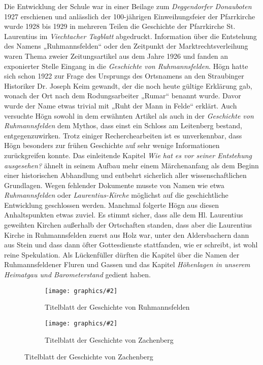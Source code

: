 \documentclass{book}
\newcommand{\img}[2][width=\linewidth]{\noindent\texttt{[image: graphics/\#2]}}
\begin{document}
Die Entwicklung der Schule war in einer Beilage zum \textit{Deggendorfer
Donauboten} 1927 erschienen und anlässlich der 100-jährigen
Einweihungsfeier der Pfarrkirche wurde 1928 bis 1929 in mehreren Teilen
die Geschichte der Pfarrkirche St. Laurentius im \textit{Viechtacher
Tagblatt} abgedruckt. Information über die Entstehung des Namens
„Ruhmannsfelden“ oder den Zeitpunkt der Marktrechtsverleihung waren
Thema zweier Zeitungsartikel aus dem Jahre 1926 und fanden an
exponierter Stelle Eingang in die \textit{Geschichte von
Ruhmannsfelden}. Högn hatte sich schon 1922 zur Frage des Ursprungs des
Ortsnamens an den Straubinger Historiker Dr. Joseph Keim gewandt, der
die noch heute gültige Erklärung gab, wonach der Ort nach dem
Rodungsarbeiter „Rumar“ benannt wurde. Davor wurde der Name etwas
trivial mit „Ruht der Mann in Felde“ erklärt. Auch versuchte Högn
sowohl in dem erwähnten Artikel als auch in der \textit{Geschichte von
Ruhmannsfelden} dem Mythos, dass einst ein Schloss am Leitenberg
bestand, entgegenzuwirken. Trotz einiger Recherchearbeiten ist es
unverkennbar, dass Högn besonders zur frühen Geschichte auf sehr
wenige Informationen zurückgreifen konnte. Das einleitende Kapitel
\textit{Wie hat es vor seiner Entstehung ausgesehen?} ähnelt in seinem
Aufbau mehr einem Märchenanfang als dem Beginn einer historischen
Abhandlung und entbehrt sicherlich aller wissenschaftlichen
Grundlagen. Wegen fehlender Dokumente musste von Namen wie etwa
\textit{Ruhmannsfelden} oder \textit{Laurentius-Kirche} möglichst auf
die geschichtliche Entwicklung geschlossen werden. Manchmal folgerte
Högn aus diesen Anhaltspunkten etwas zuviel. Es stimmt sicher, dass
alle dem Hl. Laurentius geweihten Kirchen außerhalb der Ortschaften
standen, dass aber die Laurentius Kirche in Ruhmannsfelden zuerst aus
Holz war, unter den Aldersbachern dann aus Stein und dass dann öfter
Gottesdienste stattfanden, wie er schreibt, ist wohl reine Spekulation.
Als Lückenfüller dürften die Kapitel über die Namen der
Ruhmannsfeldener Fluren und Gassen und das Kapitel \textit{Höhenlagen
in unserem Heimatgau und Barometerstand} gedient haben.

\begin{figure}
\begin{subfigure}[b]{0.5\linewidth}
\img{Geschichte-von-Ruhmannsfelden}
\caption{Titelblatt der Geschichte von Ruhmannsfelden}
\end{subfigure}
\begin{subfigure}[b]{0.5\linewidth}
\img{Geschichte-von-Zachenberg}
\caption{Titelblatt der Geschichte von Zachenberg}
\end{subfigure}
\end{figure}
\end{document}
